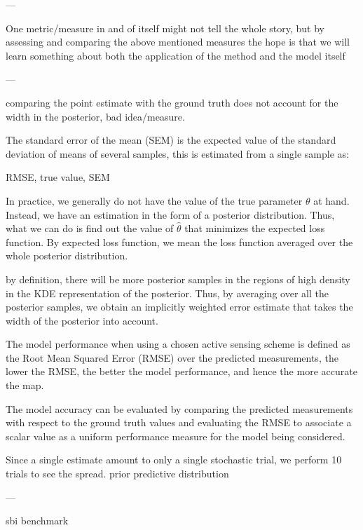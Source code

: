 ---

One metric/measure in and of itself might not tell the whole story, but by assessing and comparing the above mentioned measures the hope is that we will learn something about both the application of the method and the model itself

---

comparing the point estimate with the ground truth does not account for the width in the posterior, bad idea/measure. 

The standard error of the mean (SEM) is the expected value of the standard deviation of means of several samples, this is estimated from a single sample as: 



RMSE, true value, SEM 

In practice, we generally do not have the value of the true parameter $\theta$ at hand. Instead, we have an estimation in the form of a posterior distribution. Thus, what we can do is find out the value of $\hat{\theta}$ that minimizes the expected loss function. By expected loss function, we mean the loss function averaged over the whole posterior distribution. 


by definition, there will be more posterior samples in the regions of high density in the KDE representation of the posterior. Thus, by averaging over all the posterior samples, we obtain an implicitly weighted error estimate that takes the width of the posterior into account. 



The model performance when using a chosen active sensing scheme is defined as the Root Mean Squared Error (RMSE) over the predicted measurements, the lower the RMSE, the better the model performance, and hence the more accurate the map.

The model accuracy can be evaluated by comparing the predicted measurements with respect to the ground truth values and evaluating the RMSE to associate a scalar value as a uniform performance measure for the model being considered.


Since a single estimate amount to only a single stochastic trial, we perform 10 trials to see the spread. prior predictive distribution 

---

sbi benchmark 


